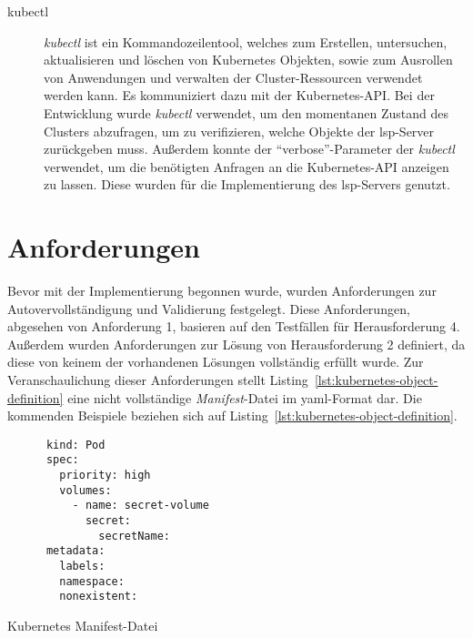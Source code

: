 \begin{description}
  \item[kubectl]
        \textit{kubectl} ist ein Kommandozeilentool, welches zum Erstellen, untersuchen, aktualisieren und löschen von Kubernetes Objekten, sowie zum Ausrollen
        von Anwendungen und verwalten der Cluster-Ressourcen verwendet werden kann. Es kommuniziert dazu mit der Kubernetes-API.\@
        Bei der Entwicklung wurde \textit{kubectl} verwendet, um den momentanen Zustand des Clusters abzufragen,
        um zu verifizieren, welche Objekte der \ac{lsp}-Server zurückgeben muss.
        Außerdem konnte der ``verbose''-Parameter der \textit{kubectl} verwendet, um die benötigten Anfragen an die Kubernetes-API anzeigen zu lassen.
        Diese wurden für die Implementierung des \ac{lsp}-Servers genutzt.
\end{description}

\section{Anforderungen}\label{sec:requirements}

Bevor mit der Implementierung begonnen wurde, wurden Anforderungen zur Autovervollständigung und Validierung festgelegt.
Diese Anforderungen, abgesehen von Anforderung 1, basieren auf den Testfällen für Herausforderung 4. Außerdem wurden Anforderungen zur Lösung von Herausforderung 2 definiert,
da diese von keinem der vorhandenen Lösungen vollständig erfüllt wurde.
Zur Veranschaulichung dieser Anforderungen stellt Listing~\ref{lst:kubernetes-object-definition} eine nicht vollständige \textit{Manifest}-Datei im \ac{yaml}-Format dar.
Die kommenden Beispiele beziehen sich auf Listing~\ref{lst:kubernetes-object-definition}.

\begin{listing}[htp]
  \begin{verbatim}
      kind: Pod
      spec: 
        priority: high
        volumes: 
          - name: secret-volume
            secret: 
              secretName: 
      metadata: 
        labels: 
        namespace:
        nonexistent:
      \end{verbatim}
  \caption{Kubernetes Manifest-Datei}
  \label{lst:kubernetes-object-definition}
\end{listing}

